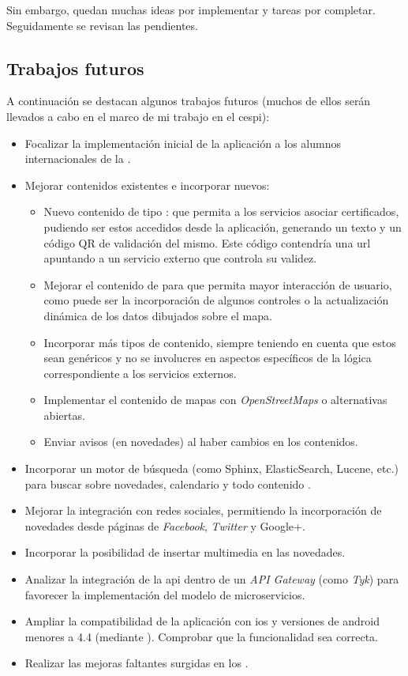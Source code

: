 Sin embargo, quedan muchas ideas por implementar y tareas por completar. Seguidamente se revisan las pendientes.

\subsection{Trabajos futuros}
\label{trabajos_futuros}

A continuación se destacan algunos trabajos futuros (muchos de ellos serán llevados a cabo en el marco de mi trabajo en el \gls{cespi}):

\begin{itemize}
\item Focalizar la implementación inicial de la aplicación a los alumnos internacionales de la \unlp{}.
\item Mejorar contenidos existentes e incorporar nuevos:
\begin{itemize}
\item Nuevo contenido de tipo : que permita a los servicios asociar certificados, pudiendo ser estos accedidos desde la aplicación, generando un texto y un código QR de validación del mismo. Este código contendría una \gls{url} apuntando a un servicio externo que controla su validez. 
\item Mejorar el contenido de  para que permita mayor interacción de usuario, como puede ser la incorporación de algunos controles o la actualización dinámica de los datos dibujados sobre el mapa.
\item Incorporar más tipos de contenido, siempre teniendo en cuenta que estos sean genéricos y no se involucres en aspectos específicos de la lógica correspondiente a los servicios externos.
\item Implementar el contenido de mapas con \textit{OpenStreetMaps} o alternativas abiertas.
\item Enviar avisos (en novedades) al haber cambios en los contenidos.
\end{itemize}
\item Incorporar un motor de búsqueda (como Sphinx, ElasticSearch, Lucene, etc.) para buscar sobre novedades, calendario y todo contenido .
\item Mejorar la integración con redes sociales, permitiendo la incorporación de novedades desde páginas de \textit{Facebook}, \textit{Twitter} y Google+.
\item Incorporar la posibilidad de insertar multimedia en las novedades.
\item Analizar la integración de la \gls{api} dentro de un \textit{API Gateway} (como \textit{Tyk}) para favorecer la implementación del modelo de microservicios.
\item Ampliar la compatibilidad de la aplicación con \gls{ios} y versiones de \gls{android} menores a 4.4 (mediante ). Comprobar que la funcionalidad sea correcta.
\item Realizar las mejoras faltantes surgidas en los .
\end{itemize}

